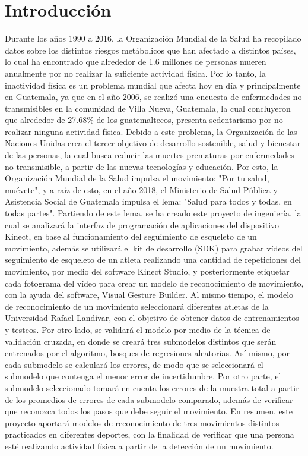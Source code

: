 \chapter{Introducci\'on}
Durante los a\~nos 1990 a 2016, la Organizaci\'on Mundial de la Salud ha recopilado datos sobre los distintos riesgos met\'abolicos que han afectado a distintos pa\'ises, lo cual ha encontrado que alrededor de 1.6 millones de personas mueren anualmente por no realizar la suficiente actividad f\'isica. Por lo tanto, la inactividad f\'isica es un problema mundial que afecta hoy en d\'ia y principalmente en Guatemala, ya que en el a\~no 2006, se realiz\'o una encuesta de enfermedades no transmisibles en la comunidad de Villa Nueva, Guatemala, la cual concluyeron que alrededor de 27.68\% de los guatemaltecos, presenta sedentarismo por no realizar ninguna actividad f\'isica.
\medbreak
Debido a este problema, la Organizaci\'on de las Naciones Unidas crea el tercer objetivo de desarrollo sostenible, salud y bienestar de las personas, la cual busca reducir las muertes prematuras por enfermedades no transmisible, a partir de las nuevas tecnolog\'ias y educaci\'on. Por esto, la Organizaci\'on Mundial de la Salud impulsa el movimiento: "Por tu salud, mu\'evete", y a ra\'iz de esto, en el a\~no 2018, el Ministerio de Salud P\'ublica y Asistencia Social de Guatemala impulsa el lema: "Salud para todos y todas, en todas partes".
\medbreak
Partiendo de este lema, se ha creado este proyecto de ingenier\'ia, la cual se analizar\'a la interfaz de programaci\'on de aplicaciones del dispositivo Kinect, en base al funcionamiento del seguimiento de esqueleto de un movimiento, adem\'as se utilizar\'a el kit de desarrollo (SDK) para grabar v\'ideos del seguimiento de esqueleto de un atleta realizando una cantidad de repeticiones del movimiento, por medio del software Kinect Studio, y posteriormente etiquetar cada fotograma del v\'ideo para crear un modelo de reconocimiento de movimiento, con la ayuda del software, Visual Gesture Builder.
\medbreak
Al mismo tiempo, el modelo de reconocimiento de un movimiento seleccionar\'a diferentes atletas de la Universidad Rafael Land\'ivar, con el objetivo de obtener datos de entrenamientos y testeos. Por otro lado, se validar\'a el modelo por medio de la t\'ecnica de validaci\'on cruzada, en donde se crear\'a tres submodelos distintos que ser\'an entrenados por el algoritmo, bosques de regresiones aleatorias. As\'i mismo, por cada submodelo se calcular\'a los errores, de modo que se seleccionar\'a el submodelo que contenga el menor error de incertidumbre.
\medbreak
Por otro parte, el submodelo seleccionado tomar\'a en cuenta los errores de la muestra total a partir de los promedios de errores de cada submodelo comparado, adem\'as de verificar que reconozca todos los pasos que debe seguir el movimiento.
\medbreak
En resumen, este proyecto aportar\'a modelos de reconocimiento de tres movimientos distintos practicados en diferentes deportes, con la finalidad de verificar que una persona est\'e realizando actividad f\'isica a partir de la detecci\'on de un movimiento.

